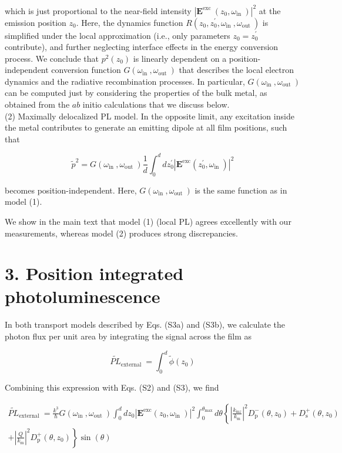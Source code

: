 \documentclass[10pt]{article}
\begin{document}
which is just proportional to the near-field intensity $\left|\mathbf{E}^{\text {exc }}\left(z_{0}, \omega_{\text {in }}\right)\right|^{2}$ at the emission position $z_{0}$. Here, the dynamics function $R\left(z_{0}, z_{0}^{\prime}, \omega_{\text {in }}, \omega_{\text {out }}\right)$ is simplified under the local approximation (i.e., only parameters $z_{0}=z_{0}^{\prime}$ contribute), and further neglecting interface effects in the energy conversion process. We conclude that $p^{2}\left(z_{0}\right)$ is linearly dependent on a position-independent conversion function $G\left(\omega_{\text {in }}, \omega_{\text {out }}\right)$ that describes the local electron dynamics and the radiative recombination processes. In particular, $G\left(\omega_{\text {in }}, \omega_{\text {out }}\right)$ can be computed just by considering the properties of the bulk metal, as obtained from the $a b$ initio calculations that we discuss below.\\
(2) Maximally delocalized PL model. In the opposite limit, any excitation inside the metal contributes to generate an emitting dipole at all film positions, such that


\begin{equation*}
\tilde{p}^{2}=G\left(\omega_{\text {in }}, \omega_{\text {out }}\right) \frac{1}{d} \int_{0}^{d} d z_{0}^{\prime}\left|\mathbf{E}^{\mathrm{exc}}\left(z_{0}^{\prime}, \omega_{\text {in }}\right)\right|^{2} \tag{S3b}
\end{equation*}


becomes position-independent. Here, $G\left(\omega_{\text {in }}, \omega_{\text {out }}\right)$ is the same function as in model (1).

We show in the main text that model (1) (local PL) agrees excellently with our measurements, whereas model (2) produces strong discrepancies.

\section*{3. Position integrated photoluminescence}
In both transport models described by Eqs. (S3a) and (S3b), we calculate the photon flux per unit area by integrating the signal across the film as

$$
\widetilde{P L}_{\text {external }}=\int_{0}^{d} \tilde{\phi}\left(z_{0}\right)
$$

Combining this expression with Eqs. (S2) and (S3), we find


\begin{gather*}
\widetilde{P L}_{\text {external }}=\frac{k^{3}}{\hbar} G\left(\omega_{\text {in }}, \omega_{\text {out }}\right) \int_{0}^{d} d z_{0}\left|\mathbf{E}^{\mathrm{exc}}\left(z_{0}, \omega_{\text {in }}\right)\right|^{2} \int_{0}^{\theta_{\max }} d \theta\left\{\left|\frac{k_{\mathrm{m} z}}{k_{\mathrm{m}}}\right|^{2} D_{\mathrm{p}}^{-}\left(\theta, z_{0}\right)+D_{\mathrm{s}}^{+}\left(\theta, z_{0}\right)\right. \\
\left.+\left|\frac{Q}{k_{\mathrm{m}}}\right|^{2} D_{\mathrm{p}}^{+}\left(\theta, z_{0}\right)\right\} \sin (\theta) \tag{S4a}
\end{gather*}
\end{document}
